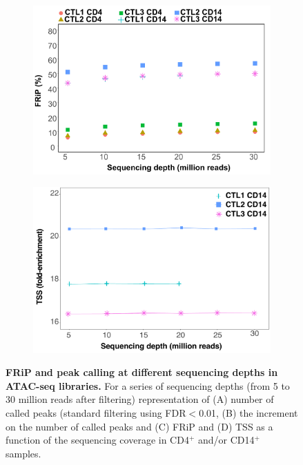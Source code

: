 \begin{figure}[H]
\begin{subfigure}{0.48\textwidth}
\includegraphics[width=\textwidth]{./Results1/pdfs/ATAC_Core_fresh_CD4_CD14_frac_reads_in_peaks_vs_depth}
\caption{\textbf{}}
\end{subfigure}%
\begin{subfigure}{0.48\textwidth}
	\centering
	\includegraphics[width=\textwidth]{./Results1/pdfs/Core_TSS_vs_sequencing_depth_CD14}
	\caption{\textbf{}}
\end{subfigure}
\caption[FRiP and peak calling at different sequencing depths in ATAC-seq libraries.]{\textbf{FRiP and peak calling at different sequencing depths in ATAC-seq libraries.} For a series of sequencing depths (from 5 to 30 million reads after filtering) representation of (A) number of called peaks (standard filtering using FDR$<$0.01, (B) the increment on the number of called peaks and (C) FRiP and (D) TSS as a function of the sequencing coverage in CD4$^+$ and/or CD14$^+$ samples.}
\label{figure:Peak_calling_versus_depth_ATAC}
\end{figure} 


